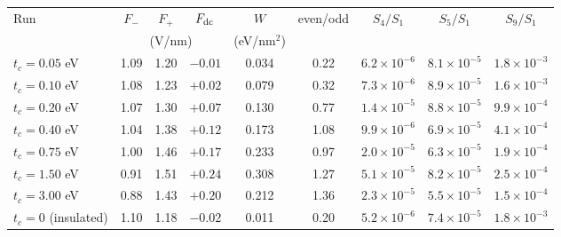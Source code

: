 \begin{tabular}{lcccccccc}
\hline\hline
Run & $F_-$ & $F_+$ & $F_{\rm dc}$ & $W$ & even/odd & $S_4/S_1$ & $S_5/S_1$ & $S_9/S_1$ \\
 & \multicolumn{3}{c}{(V/nm)} & (eV/nm$^2$) & & & & \\
\hline
$t_c=0.05$ eV & 1.09 & 1.20 & $-0.01$ & 0.034 & 0.22 & $6.2\times10^{-6}$ & $8.1\times10^{-5}$ & $1.8\times10^{-3}$ \\
$t_c=0.10$ eV & 1.08 & 1.23 & $+0.02$ & 0.079 & 0.32 & $7.3\times10^{-6}$ & $8.9\times10^{-5}$ & $1.6\times10^{-3}$ \\
$t_c=0.20$ eV & 1.07 & 1.30 & $+0.07$ & 0.130 & 0.77 & $1.4\times10^{-5}$ & $8.8\times10^{-5}$ & $9.9\times10^{-4}$ \\
$t_c=0.40$ eV & 1.04 & 1.38 & $+0.12$ & 0.173 & 1.08 & $9.9\times10^{-6}$ & $6.9\times10^{-5}$ & $4.1\times10^{-4}$ \\
$t_c=0.75$ eV & 1.00 & 1.46 & $+0.17$ & 0.233 & 0.97 & $2.0\times10^{-5}$ & $6.3\times10^{-5}$ & $1.9\times10^{-4}$ \\
$t_c=1.50$ eV & 0.91 & 1.51 & $+0.24$ & 0.308 & 1.27 & $5.1\times10^{-5}$ & $8.2\times10^{-5}$ & $2.5\times10^{-4}$ \\
$t_c=3.00$ eV & 0.88 & 1.43 & $+0.20$ & 0.212 & 1.36 & $2.3\times10^{-5}$ & $5.5\times10^{-5}$ & $1.5\times10^{-4}$ \\
$t_c=0$ (insulated) & 1.10 & 1.18 & $-0.02$ & 0.011 & 0.20 & $5.2\times10^{-6}$ & $7.4\times10^{-5}$ & $1.8\times10^{-3}$ \\
\hline\hline
\end{tabular}
